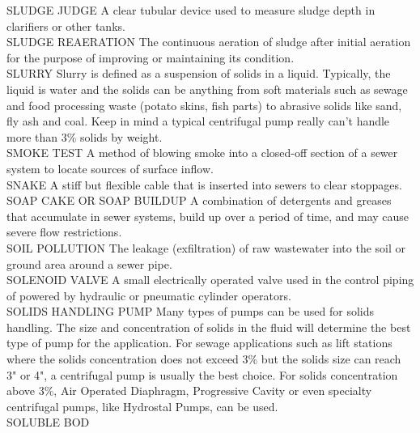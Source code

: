 \documentclass{article}
\begin{document}
SLUDGE JUDGE
A clear tubular device used to measure sludge depth in clarifiers or other tanks.
\vspace{0.3cm}\\
SLUDGE REAERATION
The continuous aeration of sludge after initial aeration for the purpose of improving or maintaining its condition.
\vspace{0.3cm}\\
SLURRY
Slurry is defined as a suspension of solids in a liquid. Typically, the liquid is water and the solids can be anything from soft materials such as sewage and food processing waste (potato skins, fish parts) to abrasive solids like sand, fly ash and coal. Keep in mind a typical centrifugal pump really can’t handle more than 3\% solids by weight.
\vspace{0.3cm}\\
SMOKE TEST
A method of blowing smoke into a closed-off section of a sewer system to locate sources of surface inflow. 
\vspace{0.3cm}\\
SNAKE
A stiff but flexible cable that is inserted into sewers to clear stoppages. 
\vspace{0.3cm}\\
SOAP CAKE OR SOAP BUILDUP
A combination of detergents and greases that accumulate in sewer systems, build up over a period of time, and may cause severe flow restrictions. 
\vspace{0.3cm}\\
SOIL POLLUTION
The leakage (exfiltration) of raw wastewater into the soil or ground area around a sewer pipe. 
\vspace{0.3cm}\\
SOLENOID VALVE
A small electrically operated valve used in the control piping of powered by hydraulic or pneumatic cylinder operators.
\vspace{0.3cm}\\
SOLIDS HANDLING PUMP
Many types of pumps can be used for solids handling. The size and concentration of solids in the fluid will determine the best type of pump for the application. For sewage applications such as lift stations where the solids concentration does not exceed 3\% but the solids size can reach 3" or 4", a centrifugal pump is usually the best choice. For solids concentration above 3\%, Air Operated Diaphragm, Progressive Cavity or even specialty centrifugal pumps, like Hydrostal Pumps, can be used.
\vspace{0.3cm}\\
SOLUBLE BOD
\end{document}
